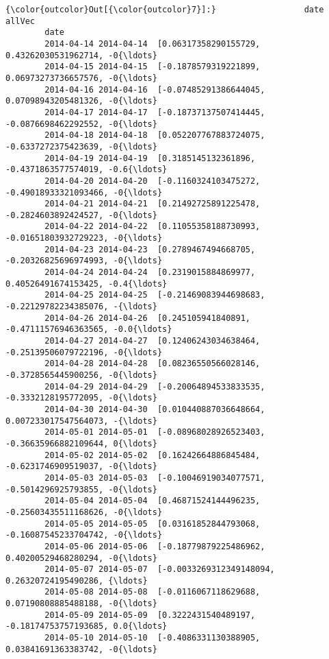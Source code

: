\documentclass[11pt]{article}
\begin{document}
\begin{Verbatim}[commandchars=\\\{\}]
{\color{outcolor}Out[{\color{outcolor}7}]:}                  date                                             allVec
        date                                                                    
        2014-04-14 2014-04-14  [0.06317358290155729, 0.43262030531962714, -0{\ldots}
        2014-04-15 2014-04-15  [-0.1878579319221899, 0.06973273736657576, -0{\ldots}
        2014-04-16 2014-04-16  [-0.07485291386644045, 0.07098943205481326, -0{\ldots}
        2014-04-17 2014-04-17  [-0.18737137507414445, -0.0876698462292552, -0{\ldots}
        2014-04-18 2014-04-18  [0.052207767883724075, -0.6337272375423639, -0{\ldots}
        2014-04-19 2014-04-19  [0.3185145132361896, -0.4371863577574019, -0.6{\ldots}
        2014-04-20 2014-04-20  [-0.1160324103475272, -0.49018933321093466, -0{\ldots}
        2014-04-21 2014-04-21  [0.21492725891225478, -0.2824603892424527, -0{\ldots}
        2014-04-22 2014-04-22  [0.11055358188730993, -0.01651803932729223, -0{\ldots}
        2014-04-23 2014-04-23  [0.2789467494668705, -0.20326825696974993, -0{\ldots}
        2014-04-24 2014-04-24  [0.2319015884869977, 0.40526491674153425, -0.4{\ldots}
        2014-04-25 2014-04-25  [-0.21469083944698683, -0.22129782234385076, -{\ldots}
        2014-04-26 2014-04-26  [0.245105941840891, -0.47111576946363565, -0.0{\ldots}
        2014-04-27 2014-04-27  [0.12406243034638464, -0.25139506079722196, -0{\ldots}
        2014-04-28 2014-04-28  [0.08236550566028146, -0.3728565445900256, -0{\ldots}
        2014-04-29 2014-04-29  [-0.20064894533833535, -0.3332128195772095, -0{\ldots}
        2014-04-30 2014-04-30  [0.010440887036648664, 0.007233017547564073, -{\ldots}
        2014-05-01 2014-05-01  [-0.08968028926523403, -0.36635966882109644, 0{\ldots}
        2014-05-02 2014-05-02  [0.16242664886845484, -0.6231746909519037, -0{\ldots}
        2014-05-03 2014-05-03  [-0.10046919034077571, -0.5014296925793855, -0{\ldots}
        2014-05-04 2014-05-04  [0.46871524144496235, -0.25603435511168626, -0{\ldots}
        2014-05-05 2014-05-05  [0.03161852844793068, -0.16087545233704742, -0{\ldots}
        2014-05-06 2014-05-06  [-0.18779879225486962, 0.40200529468280294, -0{\ldots}
        2014-05-07 2014-05-07  [-0.0033269312349148094, 0.26320724195490286, {\ldots}
        2014-05-08 2014-05-08  [-0.0116067118629688, 0.07190808885488188, -0{\ldots}
        2014-05-09 2014-05-09  [0.3222431540489197, -0.18174753757193685, 0.0{\ldots}
        2014-05-10 2014-05-10  [-0.4086331130388905, 0.03841691363383742, -0{\ldots}

\end{Verbatim}
\end{document}
